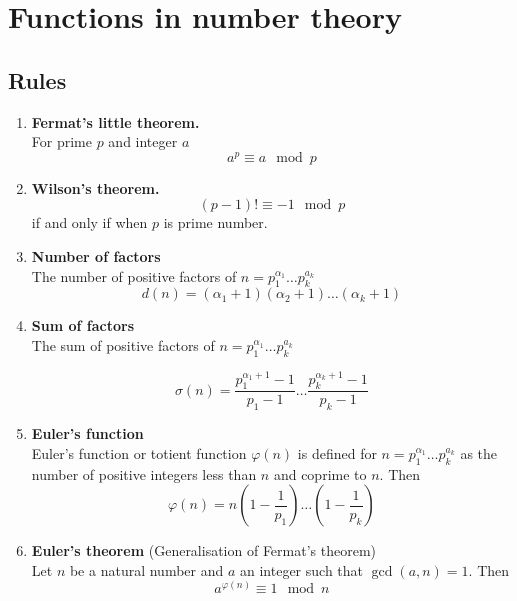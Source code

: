\documentclass{article}
\begin{document}
\section{Functions in number theory}
\subsection{Rules}
\begin{enumerate}
\item
\textbf{Fermat's little theorem.} \\
For prime $p$ and integer $a$
$$a^p \equiv a \mod p$$

\item
\textbf{Wilson's theorem.} \\
$$(p-1)! \equiv -1 \mod p$$
if and only if when $p$ is prime number.

\item 
\textbf{Number of factors} \\
The number of positive factors of $n=p_1^{\alpha_1} \dots p_k^{a_k}$
$$d(n)= (\alpha_1+1)(\alpha_2+1)\dots (\alpha_k+1)$$	
\item 
\textbf{Sum of factors} \\
The sum of positive factors of $n=p_1^{\alpha_1} \dots p_k^{a_k}$

$$\sigma(n)= \frac{p_1^{\alpha_1+1}-1}{p_1-1} \dots  \frac{p_k^{\alpha_k+1}-1}{p_k-1}$$

\item 
\textbf{Euler's function} \\
Euler’s function or totient function $\varphi(n)$ is defined for $n=p_1^{\alpha_1} \dots p_k^{a_k}$ as the number
of positive integers less than $n$ and coprime to $n$. Then
$$\varphi(n) = n \left(1-\frac{1}{p_1}\right) \dots  \left(1-\frac{1}{p_k}\right)$$


\item 
\textbf{Euler's theorem}  (Generalisation of Fermat's theorem)\\
Let $n$ be a natural number and $a$ an integer such that $\gcd(a,n)=1$. Then
$$a^{\varphi(n)} \equiv 1 \mod n $$

\end{enumerate}
\end{document}

